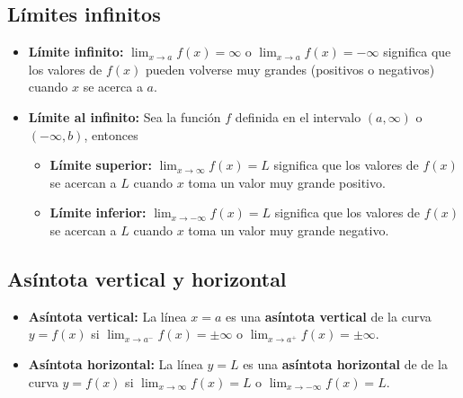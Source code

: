 \documentclass[a4paper,12pt]{article}
\theoremstyle{definition}
\begin{document}
\subsection{Límites infinitos}
\begin{itemize}
    \item \textbf{Límite infinito:} $\lim_{x \to a} f(x) = \infty$ o $\lim_{x \to a} f(x) = -\infty$ significa que los valores de $f(x)$ pueden volverse muy grandes (positivos o negativos) cuando $x$ se acerca a $a$.
    \item \textbf{Límite al infinito:} Sea la función $f$ definida en el intervalo $(a, \infty)$ o $(-\infty, b)$, entonces
    \begin{itemize}
        \item \textbf{Límite superior:} $\lim_{x \to \infty} f(x) = L$ significa que los valores de $f(x)$ se acercan a $L$ cuando $x$ toma un valor muy grande positivo.
        \item \textbf{Límite inferior: } $\lim_{x \to -\infty} f(x) = L$ significa que los valores de $f(x)$ se acercan a $L$ cuando $x$ toma un valor muy grande negativo.
    \end{itemize}
\end{itemize}

\subsection{Asíntota vertical y horizontal}
\begin{itemize}
    \item \textbf{Asíntota vertical:} La línea $x = a$ es una \textbf{asíntota vertical} de la curva $y = f(x)$ si $\lim_{x \to a^-} f(x) = \pm \infty$ o $\lim_{x \to a^+} f(x) = \pm \infty$.
    \item \textbf{Asíntota horizontal:} La línea $y = L$ es una \textbf{asíntota horizontal} de de la curva $y = f(x)$ si $\lim_{x \to \infty} f(x) = L$ o $\lim_{x \to -\infty} f(x) = L$.
\end{itemize}
\end{document}
